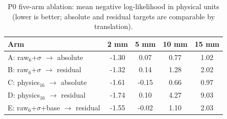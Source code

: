 \begin{table}[htbp]
\centering
\caption{P0 five-arm ablation: mean negative log-likelihood in physical units (lower is better; absolute and residual targets are comparable by translation).}
\label{tab_p0_ablation_nll}
\begin{tabular}{lcccc}
\toprule
Arm & 2 mm & 5 mm & 10 mm & 15 mm \\
\midrule
A: raw$_6$+$\sigma$ $\to$ absolute & -1.30 & 0.07 & 0.77 & 1.02 \\
B: raw$_6$+$\sigma$ $\to$ residual & -1.32 & 0.14 & 1.28 & 2.02 \\
C: physics$_{16}$ $\to$ absolute & -1.61 & -0.15 & 0.66 & 0.97 \\
D: physics$_{16}$ $\to$ residual & -1.74 & 0.10 & 4.27 & 9.03 \\
E: raw$_6$+$\sigma$+base $\to$ residual & -1.55 & -0.02 & 1.10 & 2.03 \\
\bottomrule
\end{tabular}
\end{table}
